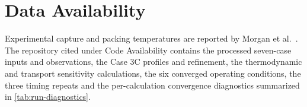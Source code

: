 \section*{Data Availability}
Experimental capture and packing temperatures are reported by Morgan et al.\ \cite{Morgan2020}.
The repository cited under Code Availability contains the processed seven-case inputs and observations, the Case 3C profiles and refinement, the thermodynamic and transport sensitivity calculations, the six converged operating conditions, the three timing repeats and the per-calculation convergence diagnostics summarized in \cref{tab:run-diagnostics}.

